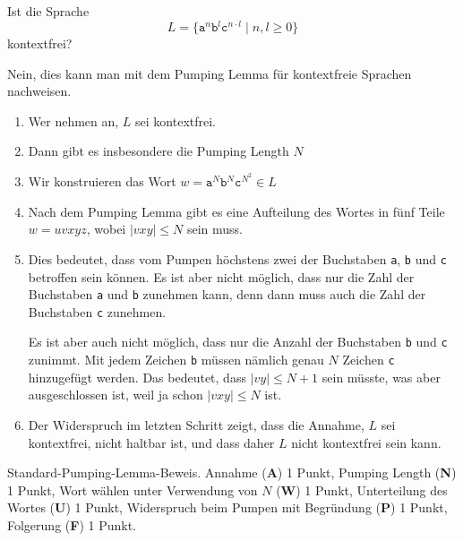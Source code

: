 Ist die Sprache 
\[
L=\{\texttt{a}^n\texttt{b}^l \texttt{c}^{n\cdot l}\;|\; n,l\ge 0\}
\]
kontextfrei?


\begin{loesung}
Nein, dies kann man mit dem Pumping Lemma für kontextfreie Sprachen
nachweisen.
\begin{enumerate}
\item
Wer nehmen an, $L$ sei kontextfrei.
\item
Dann gibt es insbesondere die Pumping Length $N$
\item
Wir konstruieren das Wort 
$w=\texttt{a}^N \texttt{b}^N \texttt{c}^{N^2}\in L$
\item 
Nach dem Pumping Lemma gibt es eine Aufteilung des Wortes in 
fünf Teile $w=uvxyz$, wobei $|vxy|\le N$ sein muss.
\item
Dies bedeutet, dass vom Pumpen höchstens zwei der Buchstaben
\texttt{a}, \texttt{b} und \texttt{c} betroffen sein können.
Es ist aber nicht möglich, dass nur die Zahl der Buchstaben
\texttt{a} und \texttt{b} zunehmen kann, denn dann muss auch
die Zahl der Buchstaben \texttt{c} zunehmen.

Es ist aber auch nicht möglich, dass nur die Anzahl der Buchstaben
\texttt{b} und \texttt{c} zunimmt.
Mit jedem Zeichen \texttt{b} müssen nämlich genau $N$ Zeichen
\texttt{c} hinzugefügt werden.
Das bedeutet, dass $|vy|\le N+1$ sein müsste, was aber ausgeschlossen
ist, weil ja schon $|vxy|\le N$ ist.
\item
Der Widerspruch im letzten Schritt zeigt, dass die Annahme,
$L$ sei kontextfrei, nicht haltbar ist, und dass daher $L$ nicht
kontextfrei sein kann.
\qedhere
\end{enumerate}
\end{loesung}

\begin{bewertung}
Standard-Pumping-Lemma-Beweis.
Annahme ({\bf A}) 1 Punkt,
Pumping Length ({\bf N}) 1 Punkt,
Wort wählen unter Verwendung von $N$ ({\bf W}) 1 Punkt,
Unterteilung des Wortes ({\bf U}) 1 Punkt,
Widerspruch beim Pumpen mit Begründung ({\bf P}) 1 Punkt,
Folgerung ({\bf F}) 1 Punkt.
\end{bewertung}
